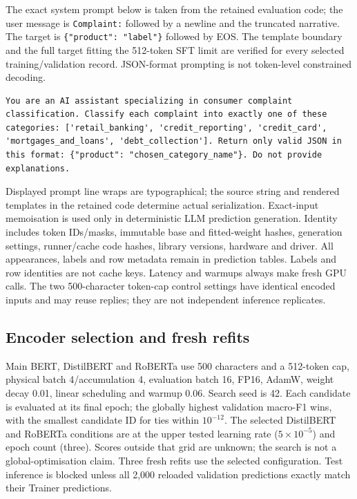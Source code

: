 \documentclass[10pt,a4paper]{article}
\begin{document}
The exact system prompt below is taken from the retained evaluation code; the user message is \texttt{Complaint:} followed by a newline and the truncated narrative. The target is \texttt{\{"product": "label"\}} followed by EOS. The template boundary and the full target fitting the 512-token SFT limit are verified for every selected training/validation record. JSON-format prompting is not token-level constrained decoding.
\begin{Verbatim}[breaklines=true,breakanywhere=true,fontsize=\small]
You are an AI assistant specializing in consumer complaint classification. Classify each complaint into exactly one of these categories: ['retail_banking', 'credit_reporting', 'credit_card', 'mortgages_and_loans', 'debt_collection']. Return only valid JSON in this format: {"product": "chosen_category_name"}. Do not provide explanations.
\end{Verbatim}
Displayed prompt line wraps are typographical; the source string and rendered templates in the retained code determine actual serialization. Exact-input memoisation is used only in deterministic LLM prediction generation. Identity includes token IDs/masks, immutable base and fitted-weight hashes, generation settings, runner/cache code hashes, library versions, hardware and driver. All appearances, labels and row metadata remain in prediction tables. Labels and row identities are not cache keys. Latency and warmups always make fresh GPU calls. The two 500-character token-cap control settings have identical encoded inputs and may reuse replies; they are not independent inference replicates.

\subsection{Encoder selection and fresh refits}
Main BERT, DistilBERT and RoBERTa use 500 characters and a 512-token cap, physical batch 4/accumulation 4, evaluation batch 16, FP16, AdamW, weight decay 0.01, linear scheduling and warmup 0.06. Search seed is 42. Each candidate is evaluated at its final epoch; the globally highest validation macro-F1 wins, with the smallest candidate ID for ties within $10^{-12}$. The selected DistilBERT and RoBERTa conditions are at the upper tested learning rate ($5\times10^{-5}$) and epoch count (three). Scores outside that grid are unknown; the search is not a global-optimisation claim. Three fresh refits use the selected configuration. Test inference is blocked unless all 2,000 reloaded validation predictions exactly match their Trainer predictions.
\end{document}
